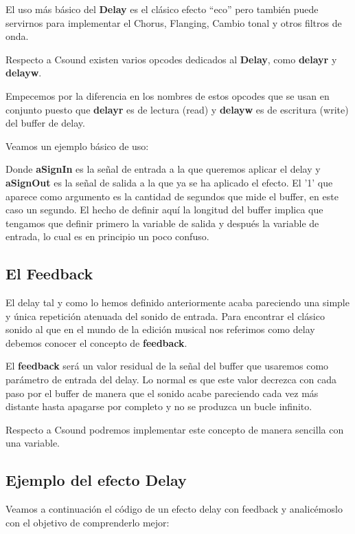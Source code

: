 El uso más básico del \textbf{Delay} es el clásico efecto ``eco'' pero también puede servirnos para implementar el Chorus, Flanging, Cambio tonal y otros filtros de onda.

Respecto a Csound existen varios opcodes dedicados al \textbf{Delay}, como \textbf{delayr} y \textbf{delayw}.

Empecemos por la diferencia en los nombres de estos opcodes que se usan en conjunto puesto que \textbf{delayr} es de lectura (read) y \textbf{delayw} es de escritura (write) del buffer de delay. 

Veamos un ejemplo básico de uso:


Donde \textbf{aSignIn} es la señal de entrada a la que queremos aplicar el delay y \textbf{aSignOut} es la señal de salida a la que ya se ha aplicado el efecto.
El '1' que aparece como argumento es la cantidad de segundos que mide el buffer, en este caso un segundo. El hecho de definir aquí la longitud del buffer implica que tengamos que definir primero la variable de salida y después la variable de entrada, lo cual es en principio un poco confuso.

\subsection{El Feedback}

El delay tal y como lo hemos definido anteriormente acaba pareciendo una simple y única repetición atenuada del sonido de entrada. Para encontrar el clásico sonido al que en el mundo de la edición musical nos referimos como delay debemos conocer el concepto de \textbf{feedback}.

El \textbf{feedback} será un valor residual de la señal del buffer que usaremos como parámetro de entrada del delay. Lo normal es que este valor decrezca con cada paso por el buffer de manera que el sonido acabe pareciendo cada vez más distante hasta apagarse por completo y no se produzca un bucle infinito.

Respecto a Csound podremos implementar este concepto de manera sencilla con una variable.

\subsection{Ejemplo del efecto Delay}

Veamos a continuación el código de un efecto delay con feedback y analicémoslo con el objetivo de comprenderlo mejor:

